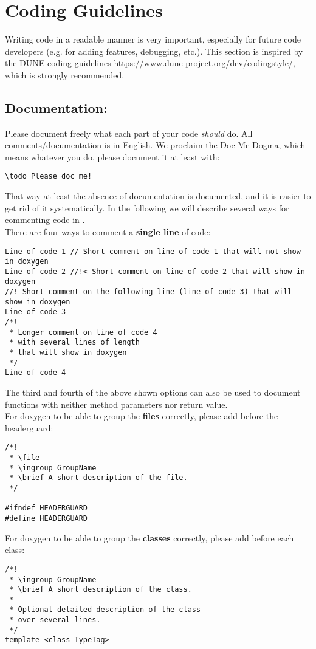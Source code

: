\section{Coding Guidelines}
\label{sc_guidelines}
Writing code in a readable manner is very important, especially
for future code developers (e.g. for adding features, debugging, etc.).
This section is inspired by the DUNE coding guidelines
\url{https://www.dune-project.org/dev/codingstyle/}, which is strongly recommended.

\subsection{Documentation:}
Please document freely what each part of your code \emph{should} do. All comments/documentation
is in English.
We proclaim the Doc-Me Dogma, which means whatever you do, please document
it at least with:
\begin{lstlisting}[style=DumuxCode]
  \todo Please doc me!
\end{lstlisting}
That way at least the absence of documentation is documented, and it is easier
to get rid of it systematically.
In the following we will describe several ways for
commenting code in \Dumux.\\
There are four ways to comment a \textbf{single line} of code:
\begin{lstlisting}[style=DumuxCode]
Line of code 1 // Short comment on line of code 1 that will not show in doxygen
Line of code 2 //!< Short comment on line of code 2 that will show in doxygen
//! Short comment on the following line (line of code 3) that will show in doxygen
Line of code 3
/*!
 * Longer comment on line of code 4
 * with several lines of length
 * that will show in doxygen
 */
Line of code 4
\end{lstlisting}
The third and fourth of the above shown options can also be used to document functions with
neither method parameters nor return value.\\
For doxygen to be able to group the \textbf{files} correctly, please add before the headerguard:
\begin{lstlisting}[style=DumuxCode]
/*!
 * \file
 * \ingroup GroupName
 * \brief A short description of the file.
 */

#ifndef HEADERGUARD
#define HEADERGUARD
\end{lstlisting}
For doxygen to be able to group the \textbf{classes} correctly, please add before each class:
\begin{lstlisting}[style=DumuxCode]
/*!
 * \ingroup GroupName
 * \brief A short description of the class.
 *
 * Optional detailed description of the class
 * over several lines.
 */
template <class TypeTag>
\end{lstlisting}

